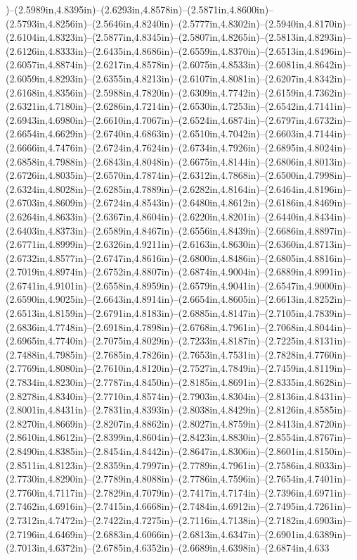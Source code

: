 )--(2.5989in,4.8395in)--(2.6293in,4.8578in)--(2.5871in,4.8600in)--(2.5793in,4.8256in)--(2.5646in,4.8240in)--(2.5777in,4.8302in)--(2.5940in,4.8170in)--(2.6104in,4.8323in)--(2.5877in,4.8345in)--(2.5807in,4.8265in)--(2.5813in,4.8293in)--(2.6126in,4.8333in)--(2.6435in,4.8686in)--(2.6559in,4.8370in)--(2.6513in,4.8496in)--(2.6057in,4.8874in)--(2.6217in,4.8578in)--(2.6075in,4.8533in)--(2.6081in,4.8642in)--(2.6059in,4.8293in)--(2.6355in,4.8213in)--(2.6107in,4.8081in)--(2.6207in,4.8342in)--(2.6168in,4.8356in)--(2.5988in,4.7820in)--(2.6309in,4.7742in)--(2.6159in,4.7362in)--(2.6321in,4.7180in)--(2.6286in,4.7214in)--(2.6530in,4.7253in)--(2.6542in,4.7141in)--(2.6943in,4.6980in)--(2.6610in,4.7067in)--(2.6524in,4.6874in)--(2.6797in,4.6732in)--(2.6654in,4.6629in)--(2.6740in,4.6863in)--(2.6510in,4.7042in)--(2.6603in,4.7144in)--(2.6666in,4.7476in)--(2.6724in,4.7624in)--(2.6734in,4.7926in)--(2.6895in,4.8024in)--(2.6858in,4.7988in)--(2.6843in,4.8048in)--(2.6675in,4.8144in)--(2.6806in,4.8013in)--(2.6726in,4.8035in)--(2.6570in,4.7874in)--(2.6312in,4.7868in)--(2.6500in,4.7998in)--(2.6324in,4.8028in)--(2.6285in,4.7889in)--(2.6282in,4.8164in)--(2.6464in,4.8196in)--(2.6703in,4.8609in)--(2.6724in,4.8543in)--(2.6480in,4.8612in)--(2.6186in,4.8469in)--(2.6264in,4.8633in)--(2.6367in,4.8604in)--(2.6220in,4.8201in)--(2.6440in,4.8434in)--(2.6403in,4.8373in)--(2.6589in,4.8467in)--(2.6556in,4.8439in)--(2.6686in,4.8897in)--(2.6771in,4.8999in)--(2.6326in,4.9211in)--(2.6163in,4.8630in)--(2.6360in,4.8713in)--(2.6732in,4.8577in)--(2.6747in,4.8616in)--(2.6800in,4.8486in)--(2.6805in,4.8816in)--(2.7019in,4.8974in)--(2.6752in,4.8807in)--(2.6874in,4.9004in)--(2.6889in,4.8991in)--(2.6741in,4.9101in)--(2.6558in,4.8959in)--(2.6579in,4.9041in)--(2.6547in,4.9000in)--(2.6590in,4.9025in)--(2.6643in,4.8914in)--(2.6654in,4.8605in)--(2.6613in,4.8252in)--(2.6513in,4.8159in)--(2.6791in,4.8183in)--(2.6885in,4.8147in)--(2.7105in,4.7839in)--(2.6836in,4.7748in)--(2.6918in,4.7898in)--(2.6768in,4.7961in)--(2.7068in,4.8044in)--(2.6965in,4.7740in)--(2.7075in,4.8029in)--(2.7233in,4.8187in)--(2.7225in,4.8131in)--(2.7488in,4.7985in)--(2.7685in,4.7826in)--(2.7653in,4.7531in)--(2.7828in,4.7760in)--(2.7769in,4.8080in)--(2.7610in,4.8120in)--(2.7527in,4.7849in)--(2.7459in,4.8119in)--(2.7834in,4.8230in)--(2.7787in,4.8450in)--(2.8185in,4.8691in)--(2.8335in,4.8628in)--(2.8278in,4.8340in)--(2.7710in,4.8574in)--(2.7903in,4.8304in)--(2.8136in,4.8431in)--(2.8001in,4.8431in)--(2.7831in,4.8393in)--(2.8038in,4.8429in)--(2.8126in,4.8585in)--(2.8270in,4.8669in)--(2.8207in,4.8862in)--(2.8027in,4.8759in)--(2.8413in,4.8720in)--(2.8610in,4.8612in)--(2.8399in,4.8604in)--(2.8423in,4.8830in)--(2.8554in,4.8767in)--(2.8490in,4.8385in)--(2.8454in,4.8442in)--(2.8647in,4.8306in)--(2.8601in,4.8150in)--(2.8511in,4.8123in)--(2.8359in,4.7997in)--(2.7789in,4.7961in)--(2.7586in,4.8033in)--(2.7730in,4.8290in)--(2.7789in,4.8088in)--(2.7786in,4.7596in)--(2.7654in,4.7401in)--(2.7760in,4.7117in)--(2.7829in,4.7079in)--(2.7417in,4.7174in)--(2.7396in,4.6971in)--(2.7462in,4.6916in)--(2.7415in,4.6668in)--(2.7484in,4.6912in)--(2.7495in,4.7261in)--(2.7312in,4.7472in)--(2.7422in,4.7275in)--(2.7116in,4.7138in)--(2.7182in,4.6903in)--(2.7196in,4.6469in)--(2.6883in,4.6066in)--(2.6813in,4.6347in)--(2.6901in,4.6389in)--(2.7013in,4.6372in)--(2.6785in,4.6352in)--(2.6689in,4.6398in)--(2.6874in,4.633
